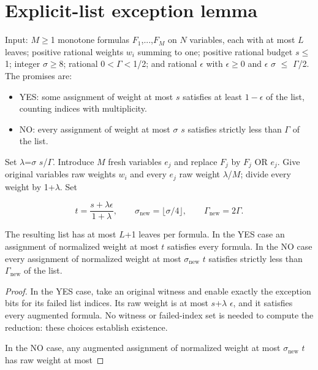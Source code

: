 \section{Explicit-list exception lemma}\label{sec:4}
\begin{lemma}\label{lem:repair} Input: \(M\)\(\ge\)1 monotone formulas \(F_1\),...,\(F_M\) on \(N\) variables, each with at most \(L\) leaves; positive rational weights \(w_i\) summing to one; positive rational budget \(s\)\(\le\)1; integer \(\sigma\)\(\ge\)8; rational 0\(<\)\(\Gamma\)\(<\)1/2; and rational \(\epsilon\) with \(\epsilon\)\(\ge\)0 and \(\epsilon\) \(\sigma\) \(\le\) \(\Gamma\)/2. The promises are:

\begin{itemize}
\item YES: some assignment of weight at most \(s\) satisfies at least \(1-\epsilon\) of the list, counting indices with multiplicity.
\item NO: every assignment of weight at most \(\sigma\) \(s\) satisfies strictly less than \(\Gamma\) of the list.
\end{itemize}

Set \(\lambda\)=\(\sigma\) \(s\)/\(\Gamma\). Introduce \(M\) fresh variables \(e_j\) and replace \(F_j\) by \(F_j\) OR \(e_j\). Give original variables raw weights \(w_i\) and every \(e_j\) raw weight \(\lambda\)/\(M\); divide every weight by 1+\(\lambda\). Set

\begin{equation}\label{eq:4}
t=\frac{s+\lambda\epsilon}{1+\lambda},\qquad \sigma_{\mathrm{new}}=\lfloor\sigma/4\rfloor,\qquad \Gamma_{\mathrm{new}}=2\Gamma.
\end{equation}

The resulting list has at most \(L\)+1 leaves per formula. In the YES case an assignment of normalized weight at most \(t\) satisfies every formula. In the NO case every assignment of normalized weight at most \(\sigma_{\mathrm{new}}\) \(t\) satisfies strictly less than \(\Gamma_{\mathrm{new}}\) of the list.\end{lemma}\begin{proof} In the YES case, take an original witness and enable exactly the exception bits for its failed list indices. Its raw weight is at most \(s\)+\(\lambda\) \(\epsilon\), and it satisfies every augmented formula. No witness or failed-index set is needed to compute the reduction: these choices establish existence.

In the NO case, any augmented assignment of normalized weight at most \(\sigma_{\mathrm{new}}\) \(t\) has raw weight at most


\end{proof}
